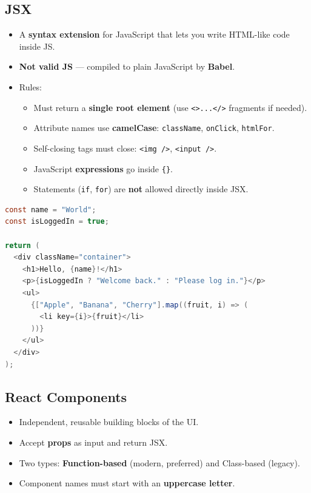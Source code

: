 \documentclass[hidelinks]{article}
\begin{document}
\subsection{JSX}
\begin{itemize}
  \item A \textbf{syntax extension} for JavaScript that lets you write HTML-like code inside JS.
  \item \textbf{Not valid JS} --- compiled to plain JavaScript by \textbf{Babel}.
  \item Rules:
    \begin{itemize}
      \item Must return a \textbf{single root element} (use \texttt{<>...</>} fragments if needed).
      \item Attribute names use \textbf{camelCase}: \texttt{className}, \texttt{onClick}, \texttt{htmlFor}.
      \item Self-closing tags must close: \texttt{<img />}, \texttt{<input />}.
      \item JavaScript \textbf{expressions} go inside \texttt{\{\}}.
      \item Statements (\texttt{if}, \texttt{for}) are \textbf{not} allowed directly inside JSX.
    \end{itemize}
\end{itemize}

\begin{lstlisting}[language=Java, caption={JSX examples}]
const name = "World";
const isLoggedIn = true;

return (
  <div className="container">
    <h1>Hello, {name}!</h1>
    <p>{isLoggedIn ? "Welcome back." : "Please log in."}</p>
    <ul>
      {["Apple", "Banana", "Cherry"].map((fruit, i) => (
        <li key={i}>{fruit}</li>
      ))}
    </ul>
  </div>
);
\end{lstlisting}

\subsection{React Components}
\begin{itemize}
  \item Independent, reusable building blocks of the UI.
  \item Accept \textbf{props} as input and return JSX.
  \item Two types: \textbf{Function-based} (modern, preferred) and Class-based (legacy).
  \item Component names must start with an \textbf{uppercase letter}.
\end{itemize}
\end{document}
